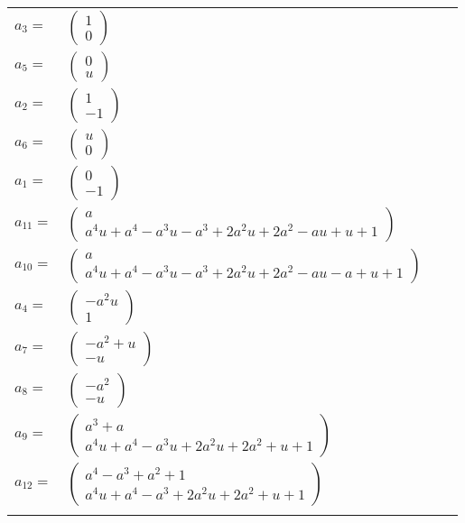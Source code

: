 \documentclass[1p]{elsarticle_modified}
\theoremstyle{definition}
\begin{document}
\begin{tabular}{m{7pt} m{180pt} m{7pt} m{180pt} }
\flushright $a_{3}=$&$\begin{pmatrix}1\\0\end{pmatrix}$ \\
\flushright $a_{5}=$&$\begin{pmatrix}0\\u\end{pmatrix}$ \\
\flushright $a_{2}=$&$\begin{pmatrix}1\\-1\end{pmatrix}$ \\
\flushright $a_{6}=$&$\begin{pmatrix}u\\0\end{pmatrix}$ \\
\flushright $a_{1}=$&$\begin{pmatrix}0\\-1\end{pmatrix}$ \\
\flushright $a_{11}=$&$\begin{pmatrix}a\\a^4 u+a^4- a^3 u- a^3+2 a^2 u+2 a^2- a u+u+1\end{pmatrix}$ \\
\flushright $a_{10}=$&$\begin{pmatrix}a\\a^4 u+a^4- a^3 u- a^3+2 a^2 u+2 a^2- a u- a+u+1\end{pmatrix}$ \\
\flushright $a_{4}=$&$\begin{pmatrix}- a^2 u\\1\end{pmatrix}$ \\
\flushright $a_{7}=$&$\begin{pmatrix}- a^2+u\\- u\end{pmatrix}$ \\
\flushright $a_{8}=$&$\begin{pmatrix}- a^2\\- u\end{pmatrix}$ \\
\flushright $a_{9}=$&$\begin{pmatrix}a^3+a\\a^4 u+a^4- a^3 u+2 a^2 u+2 a^2+u+1\end{pmatrix}$ \\
\flushright $a_{12}=$&$\begin{pmatrix}a^4- a^3+a^2+1\\a^4 u+a^4- a^3+2 a^2 u+2 a^2+u+1\end{pmatrix}$\\&\end{tabular}
\end{document}
